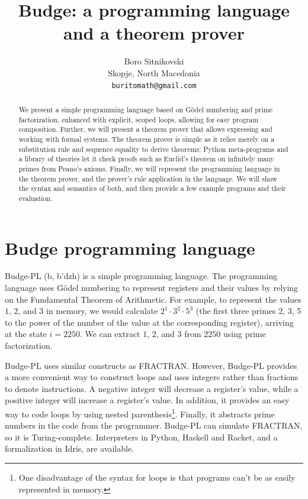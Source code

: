 \documentclass{article}
\title{Budge: a programming language and a theorem prover}
\author{
  Boro Sitnikovski \\
  Skopje, North Macedonia \\
  \texttt{buritomath@gmail.com} \\
}
\begin{document}
\maketitle

\begin{abstract}
We present a simple programming language based on Gödel numbering and prime factorization, enhanced with explicit, scoped loops, allowing for easy program composition. Further, we will present a theorem prover that allows expressing and working with formal systems. The theorem prover is simple as it relies merely on a substitution rule and sequence equality to derive theorems; Python meta-programs and a library of theories let it check proofs such as Euclid's theorem on infinitely many primes from Peano's axioms. Finally, we will represent the programming language in the theorem prover, and the prover's rule application in the language. We will show the syntax and semantics of both, and then provide a few example programs and their evaluation.
\end{abstract}


\section{Budge programming language}

Budge-PL (b\textturnv\textdyoghlig, b'dzh) is a simple programming language. The programming language uses Gödel numbering\cite{b1} to represent registers and their values by relying on the Fundamental Theorem of Arithmetic\cite{b2}. For example, to represent the values $1$, $2$, and $3$ in memory, we would calculate $2^1 \cdot 3^2 \cdot 5^3$ (the first three primes 2, 3, 5 to the power of the number of the value at the corresponding register), arriving at the state $i = 2250$. We can extract $1$, $2$, and $3$ from $2250$ using prime factorization.

Budge-PL uses similar constructs as FRACTRAN\cite{b3}. However, Budge-PL provides a more convenient way to construct loops and uses integers rather than fractions to denote instructions. A negative integer will decrease a register's value, while a positive integer will increase a register's value. In addition, it provides an easy way to code loops by using nested parenthesis\footnote{One disadvantage of the syntax for loops is that programs can't be as easily represented in memory.}. Finally, it abstracts prime numbers in the code from the programmer. Budge-PL can simulate FRACTRAN, so it is Turing-complete. Interpreters in Python, Haskell and Racket, and a formalization in Idris, are available\cite{b7}.
\end{document}
